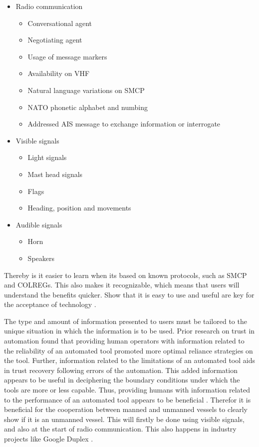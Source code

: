 \begin{itemize}
	\item Radio communication
	\begin{itemize}
		\item Conversational agent
		\item Negotiating agent
		\item Usage of message markers
		\item Availability on \ac{VHF}
		\item Natural language variations on \ac{SMCP}
		\item NATO phonetic alphabet and numbing
		\item Addressed \ac{AIS} message to exchange information or interrogate
	\end{itemize}
	\item Visible signals
	\begin{itemize}
		\item Light signals
		\item Mast head signals
		\item Flags
		\item Heading, position and movements
	\end{itemize}
	\item Audible signals
	\begin{itemize}
		\item Horn
		\item Speakers
	\end{itemize}
\end{itemize}

Thereby is it easier to learn when its based on known protocols, such as \acf{SMCP} and \ac{COLREGs}. This also makes it recognizable, which means that users will understand the benefits quicker. Show that it is easy to use and useful are key for the acceptance of technology \cite{Davis1989}.

The type and amount of information presented to users must be tailored to the unique situation in which the information is to be used. Prior research on trust in automation found that providing human operators with information related to the reliability of an automated tool promoted more optimal reliance strategies on the tool. Further, information related to the limitations of an automated tool aids in trust recovery following errors of the automation. This added information appears to be useful in deciphering the boundary conditions under which the tools are more or less capable. Thus, providing humans with information related to the performance of an automated tool appears to be beneficial \cite{Lyons2014}. Therefor it is beneficial for the cooperation between manned and unmanned vessels to clearly show if it is an unmanned vessel. This will firstly be done using visible signals, and also at the start of radio communication. This also happens in industry projects like Google Duplex \cite{Nieva2018}.